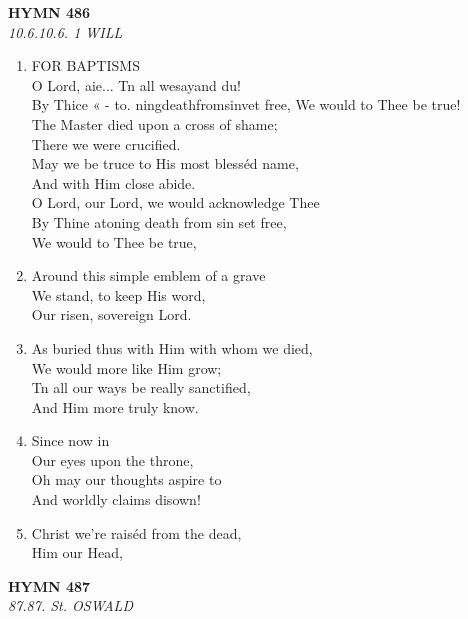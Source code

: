 \documentclass[11pt,a4paper]{article}
\begin{document}
\newpage
\begin{center}
    {\Large \textbf{HYMN 486}}
    \\
    \textit{10.6.10.6. 1 WILL}
\end{center}
\vspace{1em}

\begin{enumerate}
    \item FOR BAPTISMS \\
        O Lord, aie... Tn all wesayand du! \\
        By Thice « - to. ningdeathfromsinvet free, We would to Thee be true! \\
        The Master died upon a cross of shame; \\
        There we were crucified. \\
        May we be truce to His most blesséd name, \\
        And with Him close abide. \\
        O Lord, our Lord, we would acknowledge Thee \\
        By Thine atoning death from sin set free, \\
        We would to Thee be true,

    \item Around this simple emblem of a grave \\
        We stand, to keep His word, \\
        Our risen, sovereign Lord.

    \item As buried thus with Him with whom we died, \\
        We would more like Him grow; \\
        Tn all our ways be really sanctified, \\
        And Him more truly know.

    \item Since now in \\
        Our eyes upon the throne, \\
        Oh may our thoughts aspire to \\
        And worldly claims disown!

    \item Christ we're raiséd from the dead, \\
        Him our Head,

\end{enumerate}

\newpage
\begin{center}
    {\Large \textbf{HYMN 487}}
    \\
    \textit{87.87. St. OSWALD}
\end{center}
\vspace{1em}
\end{document}
